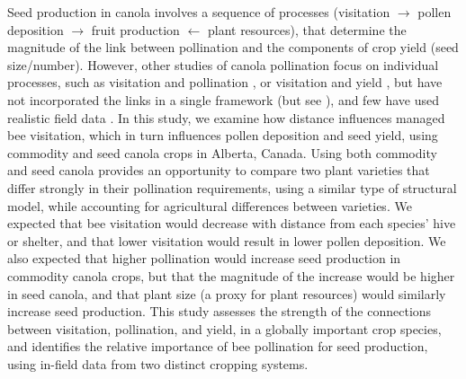 \documentclass[12pt]{article} %
\begin{document}

Seed production in canola involves a sequence of processes (visitation $\rightarrow$ pollen deposition $\rightarrow$ fruit production $\leftarrow$ plant resources), that determine the magnitude of the link between pollination and the components of crop yield (seed size/number).
However, other studies of canola pollination focus on individual processes, such as visitation and pollination \citep{cresswell1999, thomson2001}, or visitation and yield \citep{steffan2003, manning2005, hudewenz2013}, but have not incorporated the links in a single framework (but see \citealp{saez2018}), and few have used realistic field data \citep{morandin2005, isaacs2010}.
In this study, we examine how distance influences managed bee visitation, which in turn influences pollen deposition and seed yield, using commodity and seed canola crops in Alberta, Canada.
Using both commodity and seed canola provides an opportunity to compare two plant varieties that differ strongly in their pollination requirements, using a similar type of structural model, while accounting for agricultural differences between varieties.
We expected that bee visitation would decrease with distance from each species' hive or shelter, and that lower visitation would result in lower pollen deposition.
We also expected that higher pollination would increase seed production in commodity canola crops, but that the magnitude of the increase would be higher in seed canola, and that plant size (a proxy for plant resources) would similarly increase seed production.
This study assesses the strength of the connections between visitation, pollination, and yield, in a globally important crop species, and identifies the relative importance of bee pollination for seed production, using in-field data from two distinct cropping systems.
\end{document}

